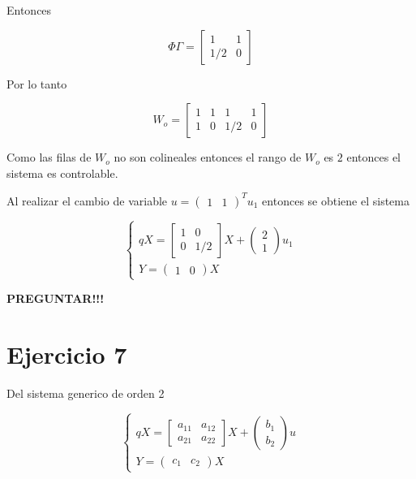 \documentclass[11pt,a4paper]{article}
\newcommand{\siseq}[1]{ \left\{ \begin{array}{c}
    #1
\end{array} \right. }
\begin{document}
   Entonces 

   \begin{equation}
       \Phi \Gamma = 
       \begin{bmatrix}
           1 & 1 \\
           1/2 & 0
       \end{bmatrix}
   \end{equation}

   Por lo tanto 

   \begin{equation}
       W_o = 
       \begin{bmatrix}
           1 & 1 & 1 & 1 \\
           1 & 0 & 1/2 & 0
       \end{bmatrix}
   \end{equation}

   Como las filas de $W_o$ no son colineales entonces el rango de $W_o$ es $2$ entonces el sistema es controlable.

   Al realizar el cambio de variable $u = \begin{pmatrix} 1 & 1 \end{pmatrix}^T u_1$ entonces se obtiene el sistema

   \begin{equation}
    \siseq{
        qX = 
        \begin{bmatrix}
            1 & 0 \\ 
            0 & 1/2
        \end{bmatrix}X 
        +
        \begin{pmatrix}
            2 \\ 1
        \end{pmatrix} u_1 \\
        Y = 
        \begin{pmatrix}
            1 & 0
        \end{pmatrix} X
    }
   \end{equation}

   \textbf{PREGUNTAR!!!}

    \section*{Ejercicio 7}

   Del sistema generico de orden 2 

   \begin{equation}
       \siseq{
           qX = 
           \begin{bmatrix}
               a_{11} & a_{12} \\
               a_{21} & a_{22}
           \end{bmatrix} X
           +
           \begin{pmatrix}
               b_1 \\ b_2
           \end{pmatrix} u \\ 
           Y = 
           \begin{pmatrix}
               c_1 & c_2
           \end{pmatrix} X
       }
   \end{equation}
\end{document}

